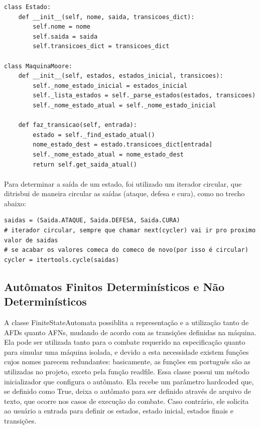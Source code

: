 \documentclass[12pt]{article}
\begin{document}
\begin{verbatim}
class Estado:
    def __init__(self, nome, saida, transicoes_dict):
        self.nome = nome
        self.saida = saida
        self.transicoes_dict = transicoes_dict
        
class MaquinaMoore:
    def __init__(self, estados, estados_inicial, transicoes):
        self._nome_estado_inicial = estados_inicial
        self._lista_estados = self._parse_estados(estados, transicoes)
        self._nome_estado_atual = self._nome_estado_inicial
    
    def faz_transicao(self, entrada):
        estado = self._find_estado_atual()
        nome_estado_dest = estado.transicoes_dict[entrada]
        self._nome_estado_atual = nome_estado_dest
        return self.get_saida_atual()

\end{verbatim}

\paragraph{}Para determinar a saída de um estado, foi utilizado um iterador circular, que ditrisbui de maneira circular as saídas (ataque, defesa e cura), como no trecho abaixo:
\begin{verbatim}
saidas = (Saida.ATAQUE, Saida.DEFESA, Saida.CURA)
# iterador circular, sempre que chamar next(cycler) vai ir pro proximo valor de saidas
# se acabar os valores comeca do comeco de novo(por isso é circular)
cycler = itertools.cycle(saidas)
\end{verbatim}

\subsection{Autômatos Finitos Determinísticos e Não Determinísticos}
A classe FiniteStateAutomata possiblita a representação e a utilização tanto de AFDs quanto AFNs, mudando de acordo com as transições definidas na máquina. Ela pode ser utilizada tanto para o combate requerido na especificação quanto para simular uma máquina isolada, e devido a esta necessidade existem funções cujos nomes parecem redundantes: basicamente, as funções em português são as utilizadas no projeto, exceto pela função readfile. Essa classe possui um método inicializador que configura o autômato. Ela recebe um parâmetro hardcoded que, se definido como True, deixa o autômato para ser definido através de arquivo de texto, que ocorre nos casos de execução do combate. Caso contrário, ele solicita ao usuário a entrada para definir os estados, estado inicial, estados finais e transições.
\end{document}
